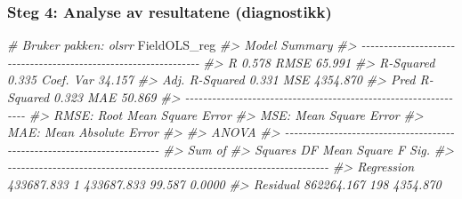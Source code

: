 \documentclass[
]{article}
\newenvironment{Shaded}{\begin{snugshade}}{\end{snugshade}}
\newcommand{\CommentTok}[1]{\textcolor[rgb]{0.56,0.35,0.01}{\textit{#1}}}
\newcommand{\NormalTok}[1]{#1}
\begin{document}
\hypertarget{steg-4-analyse-av-resultatene-diagnostikk}{%
\subsubsection{Steg 4: Analyse av resultatene (diagnostikk)}\label{steg-4-analyse-av-resultatene-diagnostikk}}

\begin{Shaded}
\begin{Highlighting}[]
\CommentTok{\# Bruker pakken: olsrr}
\NormalTok{FieldOLS\_reg}
\CommentTok{\#\textgreater{}                          Model Summary                           }
\CommentTok{\#\textgreater{} {-}{-}{-}{-}{-}{-}{-}{-}{-}{-}{-}{-}{-}{-}{-}{-}{-}{-}{-}{-}{-}{-}{-}{-}{-}{-}{-}{-}{-}{-}{-}{-}{-}{-}{-}{-}{-}{-}{-}{-}{-}{-}{-}{-}{-}{-}{-}{-}{-}{-}{-}{-}{-}{-}{-}{-}{-}{-}{-}{-}{-}{-}{-}{-}}
\CommentTok{\#\textgreater{} R                       0.578       RMSE                 65.991 }
\CommentTok{\#\textgreater{} R{-}Squared               0.335       Coef. Var            34.157 }
\CommentTok{\#\textgreater{} Adj. R{-}Squared          0.331       MSE                4354.870 }
\CommentTok{\#\textgreater{} Pred R{-}Squared          0.323       MAE                  50.869 }
\CommentTok{\#\textgreater{} {-}{-}{-}{-}{-}{-}{-}{-}{-}{-}{-}{-}{-}{-}{-}{-}{-}{-}{-}{-}{-}{-}{-}{-}{-}{-}{-}{-}{-}{-}{-}{-}{-}{-}{-}{-}{-}{-}{-}{-}{-}{-}{-}{-}{-}{-}{-}{-}{-}{-}{-}{-}{-}{-}{-}{-}{-}{-}{-}{-}{-}{-}{-}{-}}
\CommentTok{\#\textgreater{}  RMSE: Root Mean Square Error }
\CommentTok{\#\textgreater{}  MSE: Mean Square Error }
\CommentTok{\#\textgreater{}  MAE: Mean Absolute Error }
\CommentTok{\#\textgreater{} }
\CommentTok{\#\textgreater{}                                  ANOVA                                   }
\CommentTok{\#\textgreater{} {-}{-}{-}{-}{-}{-}{-}{-}{-}{-}{-}{-}{-}{-}{-}{-}{-}{-}{-}{-}{-}{-}{-}{-}{-}{-}{-}{-}{-}{-}{-}{-}{-}{-}{-}{-}{-}{-}{-}{-}{-}{-}{-}{-}{-}{-}{-}{-}{-}{-}{-}{-}{-}{-}{-}{-}{-}{-}{-}{-}{-}{-}{-}{-}{-}{-}{-}{-}{-}{-}{-}{-}}
\CommentTok{\#\textgreater{}                    Sum of                                               }
\CommentTok{\#\textgreater{}                   Squares         DF    Mean Square      F         Sig. }
\CommentTok{\#\textgreater{} {-}{-}{-}{-}{-}{-}{-}{-}{-}{-}{-}{-}{-}{-}{-}{-}{-}{-}{-}{-}{-}{-}{-}{-}{-}{-}{-}{-}{-}{-}{-}{-}{-}{-}{-}{-}{-}{-}{-}{-}{-}{-}{-}{-}{-}{-}{-}{-}{-}{-}{-}{-}{-}{-}{-}{-}{-}{-}{-}{-}{-}{-}{-}{-}{-}{-}{-}{-}{-}{-}{-}{-}}
\CommentTok{\#\textgreater{} Regression     433687.833          1     433687.833    99.587    0.0000 }
\CommentTok{\#\textgreater{} Residual       862264.167        198       4354.870                     }

\end{Highlighting}
\end{Shaded}
\end{document}
